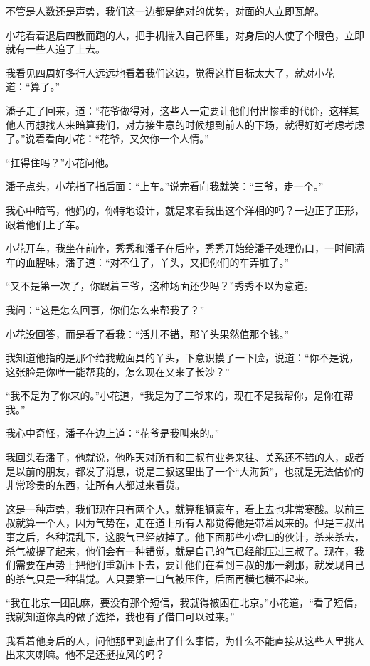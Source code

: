 不管是人数还是声势，我们这一边都是绝对的优势，对面的人立即瓦解。

小花看着退后四散而跑的人，把手机揣入自己怀里，对身后的人使了个眼色，立即就有一些人追了上去。

我看见四周好多行人远远地看着我们这边，觉得这样目标太大了，就对小花道：“算了。”

潘子走了回来，道：“花爷做得对，这些人一定要让他们付出惨重的代价，这样其他人再想找人来暗算我们，对方接生意的时候想到前人的下场，就得好好考虑考虑了。”说着看向小花：“花爷，又欠你一个人情。”

“扛得住吗？”小花问他。

潘子点头，小花指了指后面：“上车。”说完看向我就笑：“三爷，走一个。”

我心中暗骂，他妈的，你特地设计，就是来看我出这个洋相的吗？一边正了正形，跟着他们上了车。

小花开车，我坐在前座，秀秀和潘子在后座，秀秀开始给潘子处理伤口，一时间满车的血腥味，潘子道：“对不住了，丫头，又把你们的车弄脏了。”

“又不是第一次了，你跟着三爷，这种场面还少吗？”秀秀不以为意道。

我问：“这是怎么回事，你们怎么来帮我了？”

小花没回答，而是看了看我：“活儿不错，那丫头果然值那个钱。”

我知道他指的是那个给我戴面具的丫头，下意识摸了一下脸，说道：“你不是说，这张脸是你唯一能帮我的，怎么现在又来了长沙？”

“我不是为了你来的。”小花道，“我是为了三爷来的，现在不是我帮你，是你在帮我。”

我心中奇怪，潘子在边上道：“花爷是我叫来的。”

我回头看潘子，他就说，他昨天对所有和三叔有业务来往、关系还不错的人，或者是以前的朋友，都发了消息，说是三叔这里出了一个“大海货”，也就是无法估价的非常珍贵的东西，让所有人都过来看货。

这是一种声势，我们现在只有两个人，就算租辆豪车，看上去也非常寒酸。以前三叔就算一个人，因为气势在，走在道上所有人都觉得他是带着风来的。但是三叔出事之后，各种混乱下，这股气已经散掉了。他下面那些小盘口的伙计，杀来杀去，杀气被提了起来，他们会有一种错觉，就是自己的气已经能压过三叔了。现在，我们需要在声势上把他们重新压下去，要让他们在看到三叔的那一刹那，就发现自己的杀气只是一种错觉。人只要第一口气被压住，后面再横也横不起来。

“我在北京一团乱麻，要没有那个短信，我就得被困在北京。”小花道，“看了短信，我就知道你真的做了选择，我也有了借口可以过来。”

我看着他身后的人，问他那里到底出了什么事情，为什么不能直接从这些人里挑人出来夹喇嘛。他不是还挺拉风的吗？

